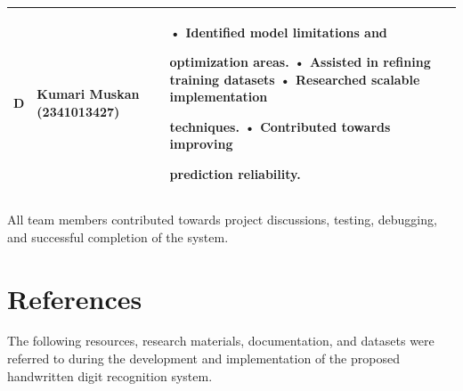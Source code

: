 \documentclass[12pt,a4paper]{article}
\begin{document}
\begin{tabular}{|c|p{4.5cm}|>{\raggedright\arraybackslash}p{7.8cm}|}
D &
\textbf{Kumari Muskan} \newline
(2341013427)
&
• Identified model limitations and \par \hspace*{0.5cm}optimization areas. \newline
• Assisted in refining training datasets \newline
• Researched scalable implementation \par \hspace*{0.5cm}techniques. \newline
• Contributed towards improving \par \hspace*{0.5cm}prediction reliability.
\\
\hline

\end{tabular}

\vspace{0.5cm}
\vspace{0.5cm}

\noindent
All team members contributed towards project discussions, testing, debugging, and successful completion of the system.
\newpage

\section{References}

\vspace{0.3cm}

\noindent
The following resources, research materials, documentation, and datasets were referred to during the development and implementation of the proposed handwritten digit recognition system.

\vspace{0.4cm}
\end{document}

